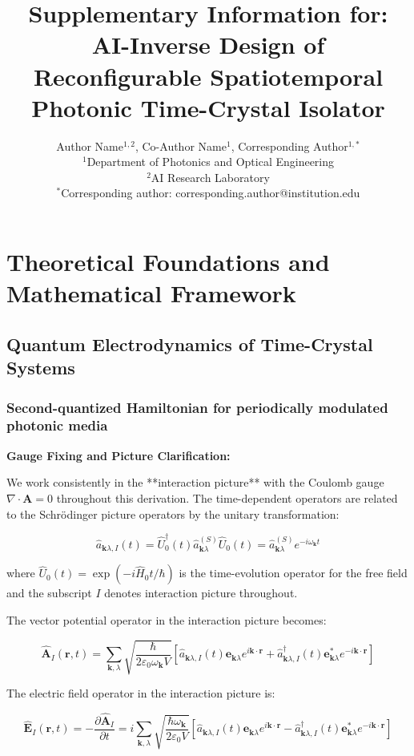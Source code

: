 \documentclass[11pt]{article}
\title{Supplementary Information for:\\
AI-Inverse Design of Reconfigurable Spatiotemporal Photonic Time-Crystal Isolator}
\author{Author Name$^{1,2}$, Co-Author Name$^{1}$, Corresponding Author$^{1,*}$\\
$^1$Department of Photonics and Optical Engineering\\
$^2$AI Research Laboratory\\
$^*$Corresponding author: corresponding.author@institution.edu}
\date{}
\begin{document}
\maketitle
\section{Theoretical Foundations and Mathematical Framework}

\subsection{Quantum Electrodynamics of Time-Crystal Systems}

\subsubsection{Second-quantized Hamiltonian for periodically modulated photonic media}

\textbf{Gauge Fixing and Picture Clarification:}

We work consistently in the **interaction picture** with the Coulomb gauge $\nabla \cdot \mathbf{A} = 0$ throughout this derivation. The time-dependent operators are related to the Schrödinger picture operators by the unitary transformation:

\begin{equation}
\hat{a}_{\mathbf{k}\lambda,I}(t) = \hat{U}_0^\dagger(t) \hat{a}_{\mathbf{k}\lambda}^{(S)} \hat{U}_0(t) = \hat{a}_{\mathbf{k}\lambda}^{(S)} e^{-i\omega_{\mathbf{k}} t}
\end{equation}

where $\hat{U}_0(t) = \exp(-i\hat{H}_0 t/\hbar)$ is the time-evolution operator for the free field and the subscript $I$ denotes interaction picture throughout.

The vector potential operator in the interaction picture becomes:

\begin{equation}
\hat{\mathbf{A}}_I(\mathbf{r}, t) = \sum_{\mathbf{k}, \lambda} \sqrt{\frac{\hbar}{2\varepsilon_0 \omega_{\mathbf{k}} V}} \left[ \hat{a}_{\mathbf{k}\lambda,I}(t) \mathbf{e}_{\mathbf{k}\lambda} e^{i\mathbf{k} \cdot \mathbf{r}} + \hat{a}_{\mathbf{k}\lambda,I}^\dagger(t) \mathbf{e}_{\mathbf{k}\lambda}^* e^{-i\mathbf{k} \cdot \mathbf{r}} \right]
\end{equation}

The electric field operator in the interaction picture is:

\begin{equation}
\hat{\mathbf{E}}_I(\mathbf{r}, t) = -\frac{\partial \hat{\mathbf{A}}_I}{\partial t} = i\sum_{\mathbf{k}, \lambda} \sqrt{\frac{\hbar\omega_{\mathbf{k}}}{2\varepsilon_0 V}} \left[ \hat{a}_{\mathbf{k}\lambda,I}(t) \mathbf{e}_{\mathbf{k}\lambda} e^{i\mathbf{k} \cdot \mathbf{r}} - \hat{a}_{\mathbf{k}\lambda,I}^\dagger(t) \mathbf{e}_{\mathbf{k}\lambda}^* e^{-i\mathbf{k} \cdot \mathbf{r}} \right]
\end{equation}
\end{document}
